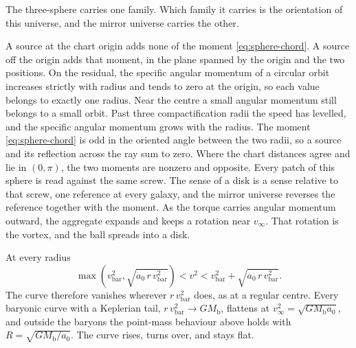 \documentclass[a4paper]{article}
\begin{document}
The three-sphere carries one family. Which family it carries is the orientation of this universe, and the mirror universe carries the other.

A source at the chart origin adds none of the moment \eqref{eq:sphere-chord}. A source off the origin adds that moment, in the plane spanned by the origin and the two positions. On the residual, the specific angular momentum of a circular orbit increases strictly with radius and tends to zero at the origin, so each value belongs to exactly one radius. Near the centre a small angular momentum still belongs to a small orbit. Past three compactification radii the speed has levelled, and the specific angular momentum grows with the radius. The moment \eqref{eq:sphere-chord} is odd in the oriented angle between the two radii, so a source and its reflection across the ray sum to zero. Where the chart distances agree and lie in \((0,\pi)\), the two moments are nonzero and opposite. Every patch of this sphere is read against the same screw. The sense of a disk is a sense relative to that screw, one reference at every galaxy, and the mirror universe reverses the reference together with the moment. As the torque carries angular momentum outward, the aggregate expands and keeps a rotation near \(v_\infty\). That rotation is the vortex, and the ball spreads into a disk.

At every radius
\[
\max\!\left(v_{\text{bar}}^2,\sqrt{a_0\,r\,v_{\text{bar}}^2}\right)<v^2<v_{\text{bar}}^2+\sqrt{a_0\,r\,v_{\text{bar}}^2}.
\]
The curve therefore vanishes wherever $r\,v_{\text{bar}}^2$ does, as at a regular centre. Every baryonic curve with a Keplerian tail, $r\,v_{\text{bar}}^2\to GM_{\text{b}}$, flattens at $v_\infty^2=\sqrt{GM_{\text{b}}a_0}$, and outside the baryons the point-mass behaviour above holds with $R=\sqrt{GM_{\text{b}}/a_0}$. The curve rises, turns over, and stays flat.
\end{document}
